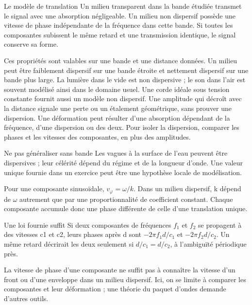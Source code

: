 \begin{loi}{Le modèle de translation}
Un milieu transparent dans la bande étudiée transmet le signal avec une absorption négligeable. Un milieu non dispersif possède une vitesse de phase indépendante de la fréquence dans cette bande. Si toutes les composantes subissent le même retard et une transmission identique, le signal conserve sa forme.
\end{loi}
Ces propriétés sont valables sur une bande et une distance données. Un milieu peut être faiblement dispersif sur une bande étroite et nettement dispersif sur une bande plus large. La lumière dans le vide est non dispersive ; le son dans l’air est souvent modélisé ainsi dans le domaine usuel. Une corde idéale sous tension constante fournit aussi un modèle non dispersif.
Une amplitude qui décroît avec la distance signale une perte ou un étalement géométrique, sans prouver une dispersion. Une déformation peut résulter d’une absorption dépendant de la fréquence, d’une dispersion ou des deux. Pour isoler la dispersion, comparer les phases et les vitesses des composantes, en plus des amplitudes.
\begin{piege}{Ne pas généraliser sans bande}
Les vagues à la surface de l’eau peuvent être dispersives ; leur célérité dépend du régime et de la longueur d’onde. Une valeur unique fournie dans un exercice peut être une hypothèse locale de modélisation.
\end{piege}


Pour une composante sinusoïdale, $v_\varphi=\omega/k$. Dans un milieu dispersif, k dépend de \ensuremath{\omega} autrement que par une proportionnalité de coefficient constant. Chaque composante accumule donc une phase différente de celle d’une translation unique.
\begin{loi}{Une loi fournie suffit}
Si deux composantes de fréquences $f_1$ et $f_2$ se propagent à des vitesses c1 et c2, leurs phases après d sont $-2\pi f_1d/c_1$ et $-2\pi f_2d/c_2$. Un même retard décrirait les deux seulement si $d/c_1=d/c_2$, à l’ambiguïté périodique près.
\end{loi}
La vitesse de phase d’une composante ne suffit pas à connaître la vitesse d’un front ou d’une enveloppe dans un milieu dispersif. Ici, on se limite à comparer les composantes et leur déformation ; une théorie du paquet d’ondes demande d’autres outils.


